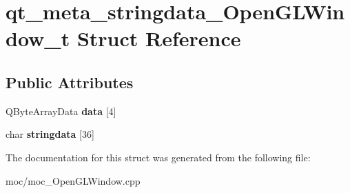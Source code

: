 \hypertarget{structqt__meta__stringdata___open_g_l_window__t}{}\section{qt\+\_\+meta\+\_\+stringdata\+\_\+\+Open\+G\+L\+Window\+\_\+t Struct Reference}
\label{structqt__meta__stringdata___open_g_l_window__t}
\subsection*{Public Attributes}
\begin{DoxyCompactItemize}
\item 
\hypertarget{structqt__meta__stringdata___open_g_l_window__t_a446763ab1eb9735ae0e4d708155ba912}{}Q\+Byte\+Array\+Data {\bfseries data} \mbox{[}4\mbox{]}\label{structqt__meta__stringdata___open_g_l_window__t_a446763ab1eb9735ae0e4d708155ba912}

\item 
\hypertarget{structqt__meta__stringdata___open_g_l_window__t_ac370b4e76c7d7c54bef1d5592a64fa47}{}char {\bfseries stringdata} \mbox{[}36\mbox{]}\label{structqt__meta__stringdata___open_g_l_window__t_ac370b4e76c7d7c54bef1d5592a64fa47}

\end{DoxyCompactItemize}


The documentation for this struct was generated from the following file\+:\begin{DoxyCompactItemize}
\item 
moc/moc\+\_\+\+Open\+G\+L\+Window.\+cpp\end{DoxyCompactItemize}
